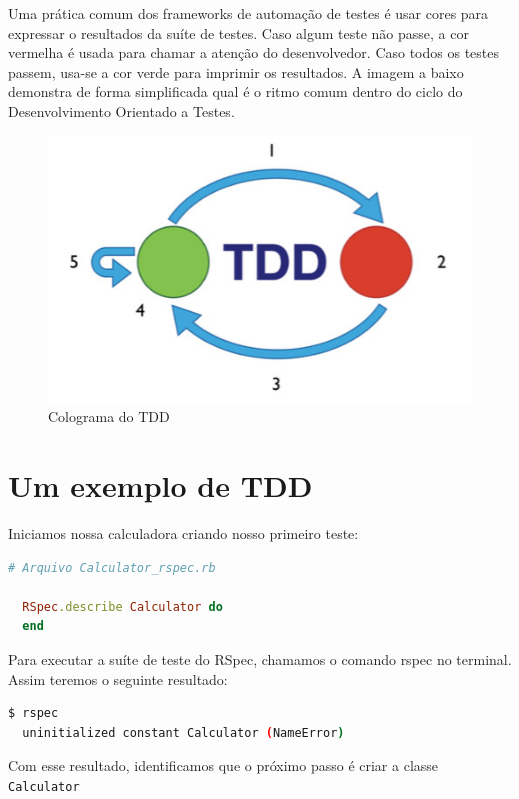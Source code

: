 \documentclass[12pt]{article}
\newcommand{\code}[1]{\texttt{#1}}
\begin{document}
  Uma prática comum dos frameworks de automação de testes é usar cores
  para expressar o resultados da suíte de testes. Caso algum teste não passe,
  a cor vermelha é usada para chamar a atenção do desenvolvedor. Caso todos os
  testes passem, usa-se a cor verde para imprimir os resultados. A 
  imagem a baixo demonstra de forma simplificada qual é o ritmo comum dentro do
  ciclo do Desenvolvimento Orientado a Testes.

  \begin{figure}[H]
    \centering
    \includegraphics[scale=1.0]{tdd_micro}
    \caption{Colograma do TDD}
  \end{figure}

  \section{Um exemplo de TDD}

  Iniciamos nossa calculadora criando nosso primeiro teste:

  \begin{lstlisting}[language=Ruby]
  # Arquivo Calculator_rspec.rb

  RSpec.describe Calculator do
  end
  \end{lstlisting}

  Para executar a suíte de teste
  do RSpec, chamamos o comando rspec no terminal. Assim teremos o seguinte
  resultado:

  \begin{lstlisting}[language=bash]
  $ rspec
  uninitialized constant Calculator (NameError)
  \end{lstlisting}

  Com esse resultado, 
  identificamos que o próximo passo é criar a classe \code{Calculator}
\end{document}
